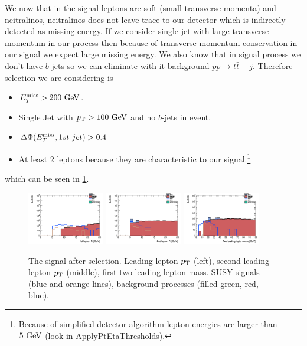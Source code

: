 \documentclass[tightenline,notitlepage,nofootinbib]{revtex4-1}
\begin{document}
We now that in the signal leptons are soft (small transverse momenta) and neitralinos, neitralinos does not leave trace to our detector which is indirectly detected as missing energy. If we consider single jet with large transverse momentum in our process then because of transverse momentum conservation in our signal we expect large missing energy. We also know that in signal process we don't have $b$-jets so we can eliminate with it background $pp \to t \bar t + j$. Therefore selection we are considering is 
\begin{itemize}
\item $E_T^{\rm{miss}}>200~\rm{GeV}$. 
\item Single Jet with $p_{\rm T}>100~\rm{GeV}$ and no $b$-jets in event. 
\item $\Delta \Phi(E_T^{\rm{miss}},1st ~jet)>0.4$
\item At least 2 leptons because they are characteristic to our signal.\footnote{Because of simplified detector algorithm lepton energies are larger than $5~\rm{GeV}$ (look in ApplyPtEtaThresholds).}
\end{itemize}
which can be seen in \cref{fig:select}.
\begin{figure}[!ht]
  \centering
  \includegraphics[width=0.3\textwidth]{h_PtMuons1st_2lead.png}
  \includegraphics[width=0.3\textwidth]{h_PtMuons2nd_2lead.png}
  \includegraphics[width=0.3\textwidth]{h_llmass_2lead.png}
  \caption{The signal after selection. Leading lepton $p_{\rm T}$ (left), second leading lepton $p_{\rm T}$ (middle), first two leading lepton mass. SUSY signals (blue and orange lines), background processes (filled green, red, blue).}
  \label{fig:select}
\end{figure}
\end{document}
